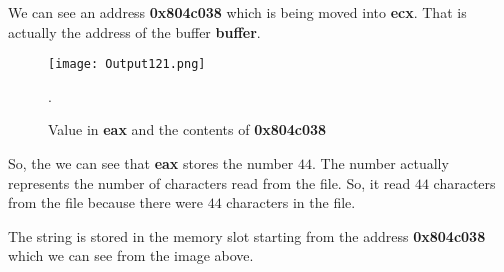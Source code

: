 \documentclass{article}
\begin{document}
We can see an address \textbf{0x804c038} which is being moved into \textbf{ecx}. That is actually the address of the buffer \textbf{buffer}.

\begin{figure}[h]
	\centering
	\texttt{[image: Output121.png]}
	\caption{Value in \textbf{eax} and the contents of \textbf{0x804c038}}.
	\label{fig:fig7}
\end{figure}

So, the we can see that \textbf{eax} stores the number $44$. The number actually represents the number of characters read from the file. So, it read $44$ characters from the file because there were $44$ characters in the file.

The string is stored in the memory slot starting from the address \textbf{0x804c038} which we can see from the image above.
\end{document}
